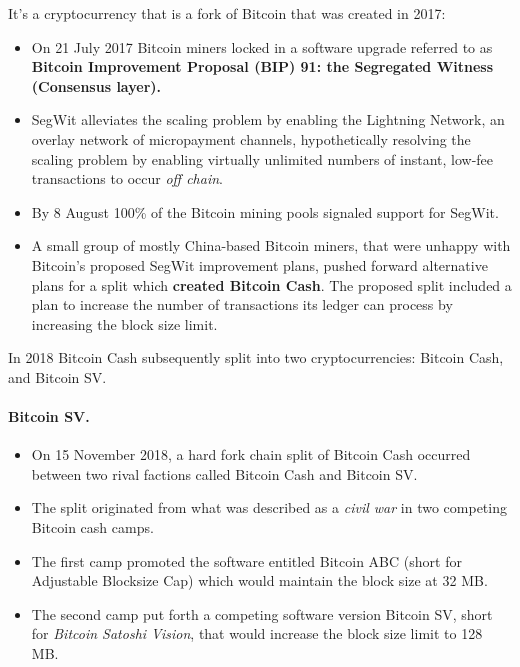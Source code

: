 It's a cryptocurrency that is a fork of Bitcoin that was created in 2017:
\begin{itemize}
	\item On 21 July 2017 Bitcoin miners locked in a software upgrade referred to as \textbf{Bitcoin Improvement Proposal (BIP) 91: the Segregated Witness (Consensus layer).}
	\item SegWit alleviates the scaling problem by enabling the Lightning Network, an overlay network of micropayment channels, hypothetically resolving the scaling problem by enabling virtually unlimited numbers of instant, low-fee transactions to occur \textit{off chain}.
	\item By 8 August 100\% of the Bitcoin mining pools signaled support for SegWit.
	\item A small group of mostly China-based Bitcoin miners, that were unhappy with Bitcoin's proposed SegWit improvement plans, pushed forward alternative plans for a split which \textbf{created Bitcoin Cash}. The proposed split included a plan to increase the number of transactions its ledger can process by increasing the block size limit.
\end{itemize}

In 2018 Bitcoin Cash subsequently split into two cryptocurrencies: Bitcoin Cash, and Bitcoin SV.

\paragraph*{Bitcoin SV.}
\begin{itemize}
	\item On 15 November 2018, a hard fork chain split of Bitcoin Cash occurred between two rival factions called Bitcoin Cash and Bitcoin SV.
	\item The split originated from what was described as a \textit{civil war} in two competing Bitcoin cash camps.
	\item The first camp promoted the software entitled Bitcoin ABC (short for Adjustable Blocksize Cap) which would maintain the block size at 32 MB.
	\item The second camp put forth a competing software version Bitcoin SV, short for \emph{Bitcoin Satoshi Vision}, that would increase the block size limit to 128 MB.
\end{itemize}

